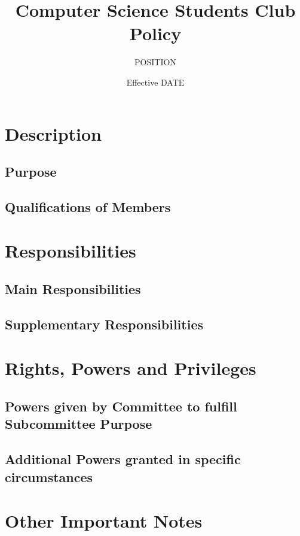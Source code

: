 \documentclass[10pt,a4paper]{report}
\title{Computer Science Students Club Policy}
\author{POSITION}
\date{Effective DATE}
\begin{document}
	\maketitle
	\newpage
	\begin{small}
		\tableofcontents
	\end{small}
	\newpage
	\chapter{Description}
		\section{Purpose}
		\section{Qualifications of Members}
	\chapter{Responsibilities}
		\section{Main Responsibilities}
		\section{Supplementary Responsibilities}
	\chapter{Rights, Powers and Privileges}
		\section{Powers given by Committee to fulfill Subcommittee Purpose}
		\section{Additional Powers granted in specific circumstances}
	\chapter{Other Important Notes}
\end{document}
